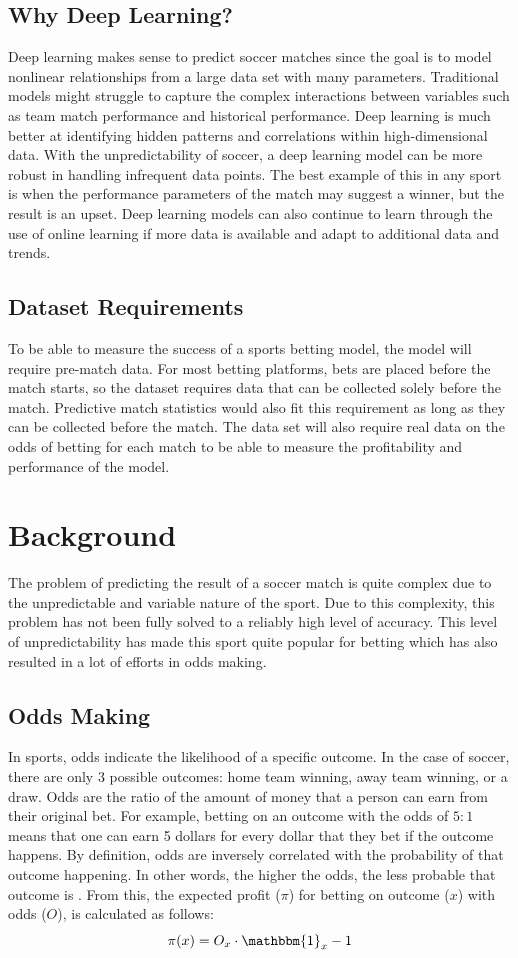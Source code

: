 \documentclass[rgb,listoffigures,listoftables,final]{cam-thesis}
\begin{document}
    \section{Why Deep Learning?}
    Deep learning makes sense to predict soccer matches since the goal is to model nonlinear relationships from a large data set with many parameters. Traditional models might struggle to capture the complex interactions between variables such as team match performance and historical performance. Deep learning is much better at identifying hidden patterns and correlations within high-dimensional data. With the unpredictability of soccer, a deep learning model can be more robust in handling infrequent data points. The best example of this in any sport is when the performance parameters of the match may suggest a winner, but the result is an upset. Deep learning models can also continue to learn through the use of online learning if more data is available and adapt to additional data and trends.

    \section{Dataset Requirements}
    To be able to measure the success of a sports betting model, the model will require pre-match data. For most betting platforms, bets are placed before the match starts, so the dataset requires data that can be collected solely before the match. Predictive match statistics would also fit this requirement as long as they can be collected before the match. The data set will also require real data on the odds of betting for each match to be able to measure the profitability and performance of the model.
    
\chapter{Background}
    The problem of predicting the result of a soccer match is quite complex due to the unpredictable and variable nature of the sport. Due to this complexity, this problem has not been fully solved to a reliably high level of accuracy. This level of unpredictability has made this sport quite popular for betting which has also resulted in a lot of efforts in odds making.
    
    \section{Odds Making}
    In sports, odds indicate the likelihood of a specific outcome. In the case of soccer, there are only 3 possible outcomes: home team winning, away team winning, or a draw. Odds are the ratio of the amount of money that a person can earn from their original bet. For example, betting on an outcome with the odds of $5:1$ means that one can earn 5 dollars for every dollar that they bet if the outcome happens. By definition, odds are inversely correlated with the probability of that outcome happening. In other words, the higher the odds, the less probable that outcome is \cite{investopedia}. From this, the expected profit ($\pi$) for betting on outcome ($x$) with odds ($O$), is calculated as follows:
    \[
        \pi(x) = O_x \cdot \mathbbm{1}_x  - 1
    \]
    
\end{document}
